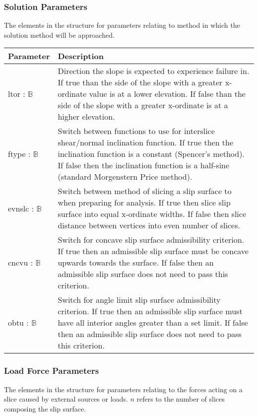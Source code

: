 \documentclass[12pt]{article}
\begin{document}
\subsubsection{Solution Parameters} \label{Tbl:SolnParam}
\noindent
The elements in the structure for parameters relating to method in
which the solution method will be approached.

\begin{center}
\begin{longtable}{ p{} 
    p{}}\hline 

  \textbf{Parameter} & \textbf{Description}\\ \hline

  ltor : $\mathbb{B}$ & Direction the slope is expected to
  experience failure in. If true than the side of the slope with a
  greater x-ordinate value is at a lower elevation. If false than the
  side of the slope with a greater x-ordinate is at a higher
  elevation.\\

  ftype : $\mathbb{B}$ & Switch between functions to use for
  interslice shear/normal inclination function. If true then the
  inclination function is a constant (Spencer's method). If false then
  the inclination function is a half-sine (standard Morgenstern Price
  method). \\

  evnslc : $\mathbb{B}$ & Switch between method of slicing a slip
  surface to when preparing for analysis. If true then slice slip
  surface into equal x-ordinate widths. If false then slice distance
  between vertices into even number of slices. \\

  cncvu : $\mathbb{B}$ & Switch for concave slip surface admissibility
  criterion. If true then an admissible slip surface must be concave
  upwards towards the surface. If false then an admissible slip
  surface does not need to pass this criterion.\\

  obtu : $\mathbb{B}$ & Switch for angle limit slip surface
  admissibility criterion. If true then an admissible slip surface
  must have all interior angles greater than a set limit. If false
  then an admissible slip surface does not need to pass this
  criterion.\\ \hline
\end{longtable}
\end{center}

\subsubsection{Load Force Parameters} \label{Tbl:LoadForceParam}
\noindent
The elements in the structure for parameters relating to the forces
acting on a slice caused by external sources or loads. $n$ refers to
the number of slices composing the slip surface.
\end{document}
